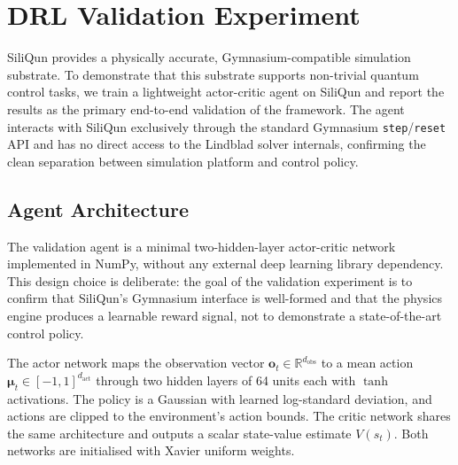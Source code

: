 
\section{DRL Validation Experiment}
\label{sec:drl_agent}

SiliQun provides a physically accurate, Gymnasium-compatible simulation substrate.
To demonstrate that this substrate supports non-trivial quantum control tasks,
we train a lightweight actor-critic agent on SiliQun and report the results
as the primary end-to-end validation of the framework.
The agent interacts with SiliQun exclusively through the standard Gymnasium
\texttt{step}/\texttt{reset} API and has no direct access to the Lindblad
solver internals, confirming the clean separation between simulation platform
and control policy.

\subsection{Agent Architecture}
\label{subsec:agent_arch}

The validation agent is a minimal two-hidden-layer actor-critic network
implemented in NumPy, without any external deep learning library dependency.
This design choice is deliberate: the goal of the validation experiment is to
confirm that SiliQun's Gymnasium interface is well-formed and that the physics
engine produces a learnable reward signal, not to demonstrate a state-of-the-art
control policy.

The actor network maps the observation vector $\mathbf{o}_t \in \mathbb{R}^{d_\text{obs}}$
to a mean action $\boldsymbol{\mu}_t \in [-1,1]^{d_\text{act}}$ through two hidden
layers of 64 units each with $\tanh$ activations.
The policy is a Gaussian with learned log-standard deviation, and actions are
clipped to the environment's action bounds.
The critic network shares the same architecture and outputs a scalar state-value
estimate $V(s_t)$.
Both networks are initialised with Xavier uniform weights.

